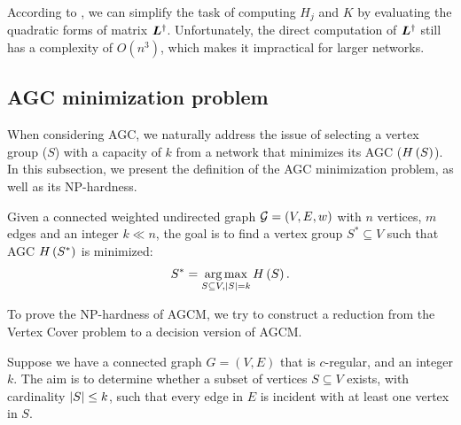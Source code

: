 \documentclass[journal]{IEEEtran}
\begin{document}
According to , we can simplify the task of computing \(H_j\) and \(K\) by evaluating the quadratic forms of matrix \(\boldsymbol{L}^{\dagger}\).
Unfortunately, the direct computation of \(\boldsymbol{L}^{\dagger}\) still has a complexity of \(O(n^3)\), which makes it impractical for larger networks.

\subsection{AGC minimization problem}

When considering AGC, we naturally address the issue of selecting a vertex group (\(S\)) with a capacity of \(k\) from a network that minimizes its AGC (\(H\left(S\right)\)).
In this subsection, we present the definition of the AGC minimization problem, as well as its NP-hardness.

\begin{problem}
Given a connected weighted undirected graph \(\mathcal{G}=(V,E,w)\) with \(n\) vertices, \(m\) edges and an integer \(k\ll n\), the goal is to find a vertex group \(S^*\subseteq V\) such that AGC \(H\left(S^*\right)\) is minimized:
\begin{equation*}
    S^*=\operatorname*{arg\,max}_{S\subseteq V,\left|S \right|=k}H\left(S\right).
\end{equation*}
\end{problem}

To prove the NP-hardness of AGCM, we try to construct a reduction from the Vertex Cover problem to a decision version of AGCM.

\begin{problem}
Suppose we have a connected graph \(G=(V,E)\) that is \(c\)-regular, and an integer \(k\). The aim is to determine whether a subset of vertices \(S\subseteq V\) exists, with cardinality \(\left|S \right|\le k\), such that every edge in \(E\) is incident with at least one vertex in \(S\).
\end{problem}
\end{document}
